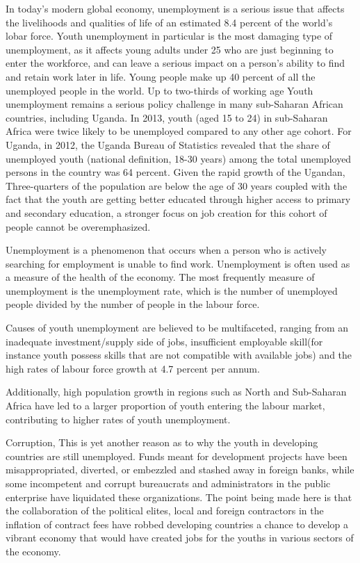 \documentclass[10pt,a4paper]{article}
\begin{document}
\begin{flushleft}
In today's modern global economy, unemployment is a serious issue that affects the livelihoods
and qualities of life of an estimated 8.4 percent of the world's lobar force. Youth unemployment in
particular is the most damaging type of unemployment, as it affects young adults under 25 who
are just beginning to enter the workforce, and can leave a serious impact on a person's ability to
find and retain work later in life. Young people make up 40 percent of all the unemployed people in
the world. Up to two-thirds of working age Youth unemployment remains a serious policy challenge in many sub-Saharan African countries, including Uganda. In 2013, youth (aged 15 to 24) in sub-Saharan Africa were twice likely to be unemployed compared to any other age cohort. For Uganda, in 2012, the Uganda Bureau of Statistics revealed that the share of unemployed youth (national definition, 18-30 years) among the total unemployed persons in the country was 64 percent. Given the rapid growth of the Ugandan, Three-quarters of the population are below the age of 30 years coupled with the fact that the youth are getting better educated through higher access to primary and secondary education, a stronger focus on job creation for this cohort of people cannot be overemphasized.\newline

Unemployment is a phenomenon that occurs when a person who is actively searching for employment is unable to find work. Unemployment is often used as a measure of the health of the economy. The most frequently measure of unemployment is the unemployment rate, which is the number of unemployed people divided by the number of people in the labour force.\newline

Causes of youth unemployment are believed to be multifaceted, ranging from an inadequate investment/supply side of jobs, insufficient employable skill(for instance youth possess skills that are not compatible with available jobs) and the high rates of labour force growth at 4.7 percent per annum. \newline

Additionally, high population growth in regions such as North and Sub-Saharan Africa have led to a larger proportion of youth entering the labour market, contributing to higher rates of youth unemployment. \newline

Corruption, This is yet another reason as to why the youth in developing countries are still unemployed. Funds meant for development projects have been misappropriated, diverted, or embezzled and stashed away in foreign banks, while some incompetent and corrupt bureaucrats and administrators in the public enterprise have liquidated these organizations. The point being made here is that the collaboration of the political elites, local and foreign contractors in the inflation of contract fees have robbed developing countries a chance to develop a vibrant economy that would have created jobs for the youths in various sectors of the economy. \newline


\end{flushleft}
\end{document}
